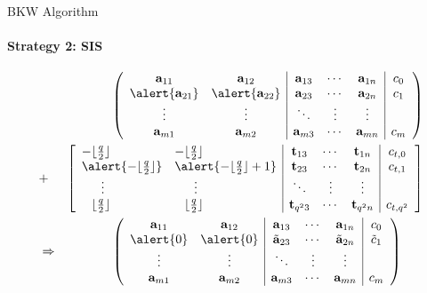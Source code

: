 \documentclass[10pt,compress]{beamer}
\renewcommand{\vec}[1]{\mathbf{#1}\xspace}
\newcommand{\shortvec}[1]{\tilde{\mathbf{#1}}\xspace}
\renewcommand{\vec}[1]{\mathbf{#1}\xspace}
\begin{document}
\begin{frame}[fragile]{BKW Algorithm}
  \framesubtitle{Strategy 2: SIS}
  \begin{eqnarray*}
    & & \left(
        \begin{array}{cc|ccc|c}
          \vec{a}_{11} & \vec{a}_{12} & \vec{a}_{13} & \cdots & \vec{a}_{1n} & c_0\\
          \alert{\vec{a}_{21}} & \alert{\vec{a}_{22}} & \vec{a}_{23} & \cdots & \vec{a}_{2n} & c_1\\
          \vdots & \vdots & \ddots & \vdots & \vdots\\
          \vec{a}_{m1} & \vec{a}_{m2} & \vec{a}_{m3} & \cdots & \vec{a}_{mn} & c_{m}
        \end{array}
                                                                               \right)\\
    &+& \left[
        \begin{array}{ll|ccc|c}
          -\lfloor\frac{q}{2}\rfloor & -\lfloor\frac{q}{2}\rfloor & \bold{t}_{13} & \cdots & \bold{t}_{1n} & c_{t,0}\\
          \alert{-\lfloor\frac{q}{2}\rfloor} & \alert{-\lfloor\frac{q}{2}\rfloor+1} & \bold{t}_{23} & \cdots & \bold{t}_{2n} & c_{t,1}\\
          \phantom{--}\vdots & \phantom{--}\vdots & \ddots & \vdots & \vdots\\
          \phantom{-}\lfloor\frac{q}{2}\rfloor & \phantom{-}\lfloor\frac{q}{2}\rfloor& \bold{t}_{q^23} & \cdots & \bold{t}_{q^2n} & c_{t,q^2}
        \end{array}\right]\\
    &\Rightarrow& \left(
                  \begin{array}{cc|ccc|c}
                    \vec{a}_{11} & \vec{a}_{12} & \vec{a}_{13} & \cdots & \vec{a}_{1n} & c_0\\
                    \alert{0} & \alert{0} & \shortvec{a}_{23} & \cdots & \shortvec{a}_{2n} & \tilde{c}_1\\
                    \vdots & \vdots & \ddots & \vdots & \vdots\\
                    \vec{a}_{m1} & \vec{a}_{m2} & \vec{a}_{m3} & \cdots & \vec{a}_{mn} & c_{m}
                  \end{array}\right)\phantom{\Longrightarrow}
  \end{eqnarray*}
\end{frame}
\end{document}

